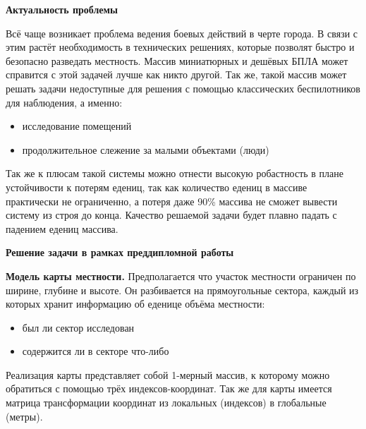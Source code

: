 \begin{slide}

\makeatletter
\let\@topfil\relax
\makeatother

    \textbf{Актуальность проблемы}

    Всё чаще возникает проблема ведения боевых действий
    в черте города. В связи с этим растёт необходимость в технических
    решениях, которые позволят быстро и безопасно разведать местность.
    Массив миниатюрных и дешёвых БПЛА может справится с этой задачей 
    лучше как никто другой. Так же, такой массив может решать задачи недоступные
    для решения с помощью классических беспилотников для наблюдения, а именно: 

    \begin{itemize}
        \item исследование помещений
        \item продолжительное слежение за малыми объектами (люди)
    \end{itemize}

    Так же к плюсам такой системы можно отнести высокую робастность в плане
    устойчивости к потерям едениц, так как количество едениц в массиве
    практически не ограниченно, а потеря даже 90\% массива не сможет
    вывести систему из строя до конца.  Качество решаемой задачи
    будет плавно падать с падением едениц массива.
\end{slide}

\begin{slide}

\makeatletter
\let\@topfil\relax
\makeatother

    \textbf{Решение задачи в рамках преддипломной работы}

    \textbf{Модель карты местности.} Предполагается что участок местности ограничен по ширине, глубине и высоте.
    Он разбивается на прямоугольные сектора, каждый из которых хранит информацию об еденице объёма местности:
    \begin{itemize}
        \item был ли сектор исследован
        \item содержится ли в секторе что-либо
    \end{itemize}
    Реализация карты представляет собой 1-мерный массив, к которому можно обратиться с помощью трёх
    индексов-координат. Так же для карты имеется матрица трансформации координат из локальных (индексов)
    в глобальные (метры).

\end{slide}

